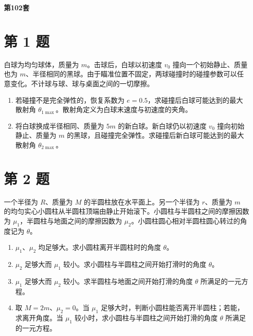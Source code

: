 \documentclass[12pt,a4paper,UTF8]{ctexart}
\newcommand{\tightlist}{\setlength{\itemsep}{0pt}\setlength{\parskip}{0pt}}
\begin{document}
\begin{titlepage}
  \centering
  \vspace*{58mm}
  {\Huge\bfseries\color{ContestBlue} 第102套\par}
  \vfill
  \vspace*{28mm}
\end{titlepage}


\section{第 1 题}\label{ux7b2c-1-ux9898}

白球为均匀球体，质量为 \(m\)。击球后，白球以初速度 \(v_0\)
撞向一个初始静止、质量也为
\(m\)、半径相同的黑球。由于瞄准位置不固定，两球碰撞时的碰撞参数可以任意变化。不计球与球、球与桌面之间的一切摩擦。

\begin{enumerate}
\def\labelenumi{\arabic{enumi}.}
\tightlist
\item
  若碰撞不是完全弹性的，恢复系数为
  \(e=0.5\)，求碰撞后白球可能达到的最大散射角
  \(\theta_{1\max}\)。散射角定义为白球末速度与初速度的夹角。
\item
  将白球换成半径相同、质量为 \(5m\) 的新白球。新白球仍以初速度 \(v_0\)
  撞向初始静止、质量为 \(m\)
  的黑球，且碰撞完全弹性。求碰撞后新白球可能达到的最大散射角
  \(\theta_{2\max}\)。
\end{enumerate}

\newpage

\section{第 2 题}\label{ux7b2c-2-ux9898}

一个半径为 \(R\)、质量为 \(M\) 的半圆柱放在水平面上。另一个半径为
\(r\)、质量为 \(m\)
的均匀实心小圆柱从半圆柱顶端由静止开始滚下。小圆柱与半圆柱之间的摩擦因数为
\(\mu_1\)，半圆柱与地面之间的摩擦因数为
\(\mu_2\)。小圆柱圆心相对半圆柱圆心转过的角度记为 \(\theta\)。

\begin{enumerate}
\def\labelenumi{\arabic{enumi}.}
\tightlist
\item
  \(\mu_1\)、\(\mu_2\) 均足够大。求小圆柱离开半圆柱时的角度 \(\theta\)。
\item
  \(\mu_2\) 足够大而 \(\mu_1\)
  较小。求小圆柱与半圆柱之间开始打滑时的角度 \(\theta\)。
\item
  \(\mu_1\) 足够大而 \(\mu_2\) 较小。求半圆柱与地面之间开始打滑的角度
  \(\theta\) 所满足的一元方程。
\item
  取 \(M=2m\)、\(\mu_2=0\)。当 \(\mu_1\)
  足够大时，判断小圆柱能否离开半圆柱；若能，求离开角度。当 \(\mu_1\)
  较小时，求小圆柱与半圆柱之间开始打滑的角度 \(\theta\)
  所满足的一元方程。
\end{enumerate}
\end{document}
